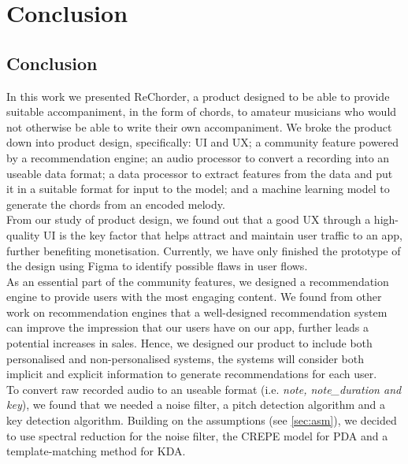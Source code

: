 


\chapter{Conclusion} %
\label{Conclusion} %

\section{Conclusion}

In this work we presented ReChorder, a product designed to be able to provide suitable accompaniment, in the form of chords, to amateur musicians who would not otherwise be able to write their own accompaniment.
We broke the product down into 
product design, specifically: UI and UX; 
a community feature powered by a recommendation engine; 
an audio processor to convert a recording into an useable data format; 
a data processor to extract features from the data and put it in a suitable format for input to the model;
and a machine learning model to generate the chords from an encoded melody. 
\\
From our study of product design, we found out that a good UX through a high-quality UI is the key factor that helps attract and maintain user traffic to an app, further benefiting monetisation. 
Currently, we have only finished the prototype of the design using Figma to identify possible flaws in user flows. 
\\
As an essential part of the community features, we designed a recommendation engine to provide users with the most engaging content.
We found from other work on recommendation engines that a well-designed recommendation system can improve the impression that our users have on our app, further leads a potential increases in sales.
Hence, we designed our product to include both personalised and non-personalised systems, the systems will consider both implicit and explicit information to 
generate recommendations for each user.
\\
To convert raw recorded audio to an useable format (i.e. \emph{note, note\_duration and key}), we found that we needed a noise filter, a pitch detection algorithm and a key detection algorithm. 
Building on the assumptions (see \cref{sec:asm}), we decided to use spectral reduction for the noise filter, the CREPE model for PDA and a template-matching method for KDA.

